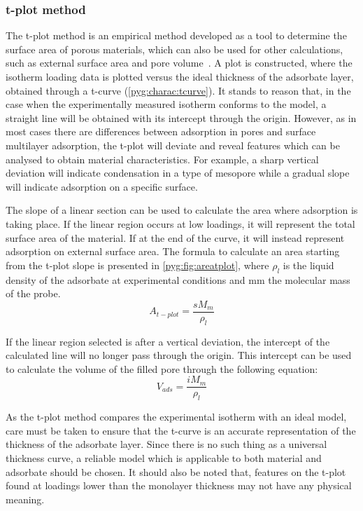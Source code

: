 \subsubsection{t-plot method}\label{pyg:charac:tplot}

The t-plot method is an empirical method developed as a
tool to determine the surface area of porous materials,
which can also be used for other calculations, such as
external surface area and pore volume~\cite{lippensStudiesPoreSystems1965}.
A plot is constructed, where the isotherm loading
data is plotted versus the ideal thickness of the adsorbate layer,
obtained through a t-curve (\autoref{pyg:charac:tcurve}).
It stands to reason that, in the case when the experimentally measured
isotherm conforms to the model, a straight line will be obtained with its
intercept through the origin. However, as in most cases there
are differences between adsorption in pores and surface multilayer
adsorption, the t-plot will deviate and reveal features which can
be analysed to obtain material characteristics. For example, a sharp
vertical deviation will indicate condensation in a type of mesopore
while a gradual slope will indicate adsorption on a specific surface.

The slope of a linear section can be used to calculate the area where
adsorption is taking place. If the linear region occurs at low loadings,
it will represent the total surface area of the material.
If at the end of the curve, it will instead represent adsorption on
external surface area. The formula to calculate an area starting
from the t-plot slope is presented in \autoref{pyg:fig:areatplot},
where \(\rho_{l}\) is the liquid density of the adsorbate at experimental
conditions and \gls{mm} the molecular mass of the probe.
%
\begin{equation}\label{pyg:fig:areatplot}
	A_{t-plot} = \frac{s M_m}{\rho_{l}}
\end{equation}

If the linear region selected is after a vertical deviation,
the intercept of the calculated line will no longer pass through
the origin. This intercept can be used to calculate the volume of
the filled pore through the following equation:
%
\begin{equation}
	V_{ads} = \frac{i M_m}{\rho_{l}}
\end{equation}

As the t-plot method compares the experimental isotherm
with an ideal model, care must be taken to ensure that the t-curve
is an accurate representation of the thickness of the adsorbate layer.
Since there is no such thing as a universal thickness curve,
a reliable model which is applicable to both material and adsorbate
should be chosen. It should also be noted that, features on the t-plot
found at loadings lower than the monolayer thickness may not have any
physical meaning.

